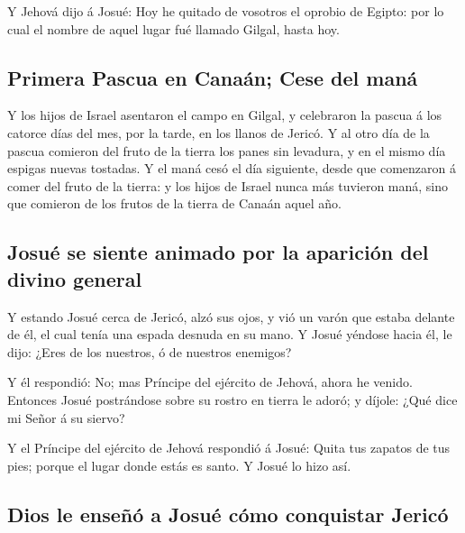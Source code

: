  Y Jehová dijo á Josué: Hoy he quitado de vosotros el
oprobio de Egipto: por lo cual el nombre de aquel lugar fué llamado
Gilgal, hasta hoy.

\hypertarget{primera-pascua-en-canauxe1n-cese-del-manuxe1}{%
\subsection{Primera Pascua en Canaán; Cese del
maná}\label{primera-pascua-en-canauxe1n-cese-del-manuxe1}}

 Y los hijos de Israel asentaron el campo en Gilgal, y
celebraron la pascua á los catorce días del mes, por la tarde, en los
llanos de Jericó.  Y al otro día de la pascua comieron del
fruto de la tierra los panes sin levadura, y en el mismo día espigas
nuevas tostadas.  Y el maná cesó el día siguiente, desde
que comenzaron á comer del fruto de la tierra: y los hijos de Israel
nunca más tuvieron maná, sino que comieron de los frutos de la tierra de
Canaán aquel año.

\hypertarget{josuuxe9-se-siente-animado-por-la-apariciuxf3n-del-divino-general}{%
\subsection{Josué se siente animado por la aparición del divino
general}\label{josuuxe9-se-siente-animado-por-la-apariciuxf3n-del-divino-general}}

 Y estando Josué cerca de Jericó, alzó sus ojos, y vió un
varón que estaba delante de él, el cual tenía una espada desnuda en su
mano. Y Josué yéndose hacia él, le dijo: ¿Eres de los nuestros, ó de
nuestros enemigos?

 Y él respondió: No; mas Príncipe del ejército de Jehová,
ahora he venido. Entonces Josué postrándose sobre su rostro en tierra le
adoró; y díjole: ¿Qué dice mi Señor á su siervo?

 Y el Príncipe del ejército de Jehová respondió á Josué:
Quita tus zapatos de tus pies; porque el lugar donde estás es santo. Y
Josué lo hizo así.

\hypertarget{dios-le-enseuxf1uxf3-a-josuuxe9-cuxf3mo-conquistar-jericuxf3}{%
\subsection{Dios le enseñó a Josué cómo conquistar
Jericó}\label{dios-le-enseuxf1uxf3-a-josuuxe9-cuxf3mo-conquistar-jericuxf3}}


